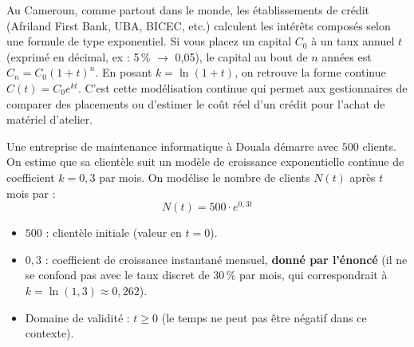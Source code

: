 \documentclass[11pt]{article}
\begin{document}
\begin{savaistu}
Au Cameroun, comme partout dans le monde, les établissements de crédit (Afriland First Bank, UBA, BICEC, etc.) calculent les intérêts composés selon une formule de type exponentiel. Si vous placez un capital $C_0$ à un taux annuel $t$ (exprimé en décimal, ex : 5\,\% $\to$ 0,05), le capital au bout de $n$ années est $C_n = C_0 (1+t)^n$. En posant $k = \ln(1+t)$, on retrouve la forme continue $C(t) = C_0 e^{kt}$. C'est cette modélisation continue qui permet aux gestionnaires de comparer des placements ou d'estimer le coût réel d'un crédit pour l'achat de matériel d'atelier.
\end{savaistu}

\begin{exemplebox}
Une entreprise de maintenance informatique à Douala démarre avec $500$ clients. On estime que sa clientèle suit un modèle de croissance exponentielle continue de coefficient $k = 0,3$ par mois. On modélise le nombre de clients $N(t)$ après $t$ mois par :
\[
N(t) = 500 \cdot e^{0,3t}
\]
\begin{itemize}
    \item $500$ : clientèle initiale (valeur en $t=0$).
    \item $0,3$ : coefficient de croissance instantané mensuel, \textbf{donné par l'énoncé} (il ne se confond pas avec le taux discret de $30\,\%$ par mois, qui correspondrait à $k = \ln(1,3) \approx 0,262$).
    \item Domaine de validité : $t \ge 0$ (le temps ne peut pas être négatif dans ce contexte).
\end{itemize}
\end{exemplebox}
\end{document}
